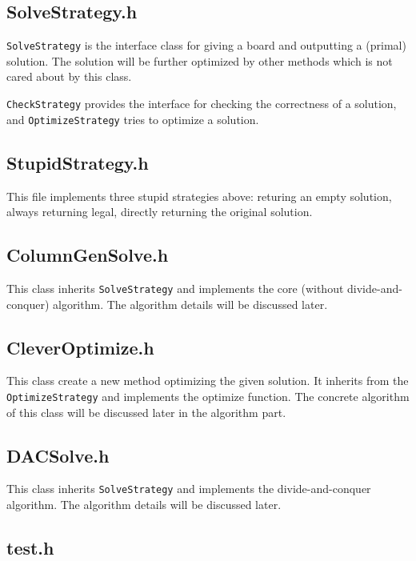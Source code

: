 \documentclass[12pt, a4paper]{article}
\begin{document}
		\subsection{SolveStrategy.h}
		
			\texttt{SolveStrategy} is the interface class for giving a board and outputting a (primal) solution. The solution will be further optimized by other methods which is not cared about by this class.
			
			\texttt{CheckStrategy} provides the interface for checking the correctness of a solution, and \texttt{OptimizeStrategy} tries to optimize a solution.
		
		\subsection{StupidStrategy.h}
			
			This file implements three stupid strategies above: returing an empty solution, always returning legal, directly returning the original solution.
		
		\subsection{ColumnGenSolve.h}
		
			This class inherits \texttt{SolveStrategy} and implements the core (without divide-and-conquer) algorithm. The algorithm details will be discussed later.
		
		\subsection{CleverOptimize.h}
		
			This class create a new method optimizing the given solution. It inherits from the \texttt{OptimizeStrategy} and implements the optimize function. The concrete algorithm of this class will be discussed later in the algorithm part.
		
		\subsection{DACSolve.h}
		
			This class inherits \texttt{SolveStrategy} and implements the divide-and-conquer algorithm. The algorithm details will be discussed later.
		
		\subsection{test.h}
		
\end{document}
